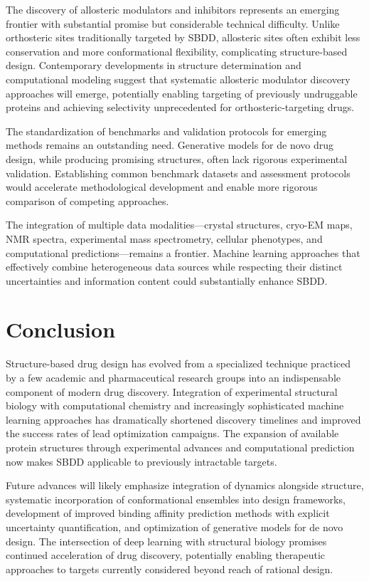 \documentclass[12pt,a4paper]{article}
\begin{document}
The discovery of allosteric modulators and inhibitors represents an emerging frontier with substantial promise but considerable technical difficulty. Unlike orthosteric sites traditionally targeted by SBDD, allosteric sites often exhibit less conservation and more conformational flexibility, complicating structure-based design. Contemporary developments in structure determination and computational modeling suggest that systematic allosteric modulator discovery approaches will emerge, potentially enabling targeting of previously undruggable proteins and achieving selectivity unprecedented for orthosteric-targeting drugs.

The standardization of benchmarks and validation protocols for emerging methods remains an outstanding need. Generative models for de novo drug design, while producing promising structures, often lack rigorous experimental validation. Establishing common benchmark datasets and assessment protocols would accelerate methodological development and enable more rigorous comparison of competing approaches.

The integration of multiple data modalities—crystal structures, cryo-EM maps, NMR spectra, experimental mass spectrometry, cellular phenotypes, and computational predictions—remains a frontier. Machine learning approaches that effectively combine heterogeneous data sources while respecting their distinct uncertainties and information content could substantially enhance SBDD.

\section*{Conclusion}

Structure-based drug design has evolved from a specialized technique practiced by a few academic and pharmaceutical research groups into an indispensable component of modern drug discovery. Integration of experimental structural biology with computational chemistry and increasingly sophisticated machine learning approaches has dramatically shortened discovery timelines and improved the success rates of lead optimization campaigns. The expansion of available protein structures through experimental advances and computational prediction now makes SBDD applicable to previously intractable targets.

Future advances will likely emphasize integration of dynamics alongside structure, systematic incorporation of conformational ensembles into design frameworks, development of improved binding affinity prediction methods with explicit uncertainty quantification, and optimization of generative models for de novo design. The intersection of deep learning with structural biology promises continued acceleration of drug discovery, potentially enabling therapeutic approaches to targets currently considered beyond reach of rational design.
\end{document}
